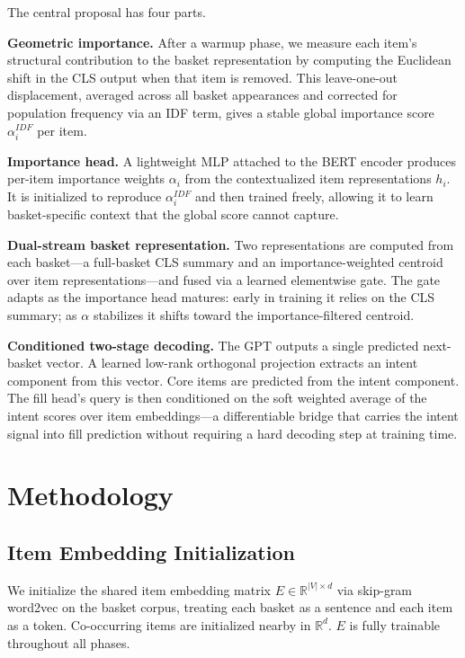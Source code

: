 \documentclass[conference]{IEEEtran}
\begin{document}
The central proposal has four parts.

\textbf{Geometric importance.} After a warmup phase, we measure each
item's structural contribution to the basket representation by computing
the Euclidean shift in the CLS output when that item is removed. This
leave-one-out displacement, averaged across all basket appearances and
corrected for population frequency via an IDF term, gives a stable
global importance score $\alpha_i^{IDF}$ per item.

\textbf{Importance head.} A lightweight MLP attached to the BERT
encoder produces per-item importance weights $\alpha_i$ from the
contextualized item representations $h_i$. It is initialized to
reproduce $\alpha_i^{IDF}$ and then trained freely, allowing it to
learn basket-specific context that the global score cannot capture.

\textbf{Dual-stream basket representation.} Two representations are
computed from each basket---a full-basket CLS summary and an
importance-weighted centroid over item representations---and fused via
a learned elementwise gate. The gate adapts as the importance head
matures: early in training it relies on the CLS summary; as $\alpha$
stabilizes it shifts toward the importance-filtered centroid.

\textbf{Conditioned two-stage decoding.} The GPT outputs a single
predicted next-basket vector. A learned low-rank orthogonal projection
extracts an intent component from this vector. Core items are predicted
from the intent component. The fill head's query is then conditioned on
the soft weighted average of the intent scores over item embeddings---a
differentiable bridge that carries the intent signal into fill
prediction without requiring a hard decoding step at training time.


\section{Methodology}
\label{sec:method}

\subsection{Item Embedding Initialization}

We initialize the shared item embedding matrix
$E \in \mathbb{R}^{|V| \times d}$ via skip-gram word2vec on the basket
corpus, treating each basket as a sentence and each item as a token.
Co-occurring items are initialized nearby in $\mathbb{R}^d$. $E$ is
fully trainable throughout all phases.
\end{document}
